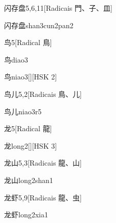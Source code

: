 \begin{entry}{闪存盘}{5,6,11}[Radicais ⾨、⼦、⽫]
  \begin{phonetics}{闪存盘}{shan3cun2pan2}
  \end{phonetics}
\end{entry}

\begin{entry}{鸟}{5}[Radical ⿃]
  \begin{phonetics}{鸟}{diao3}
  \end{phonetics}
  \begin{phonetics}{鸟}{niao3}[][HSK 2]
  \end{phonetics}
\end{entry}

\begin{entry}{鸟儿}{5,2}[Radicais ⿃、⼉]
  \begin{phonetics}{鸟儿}{niao3r5}
  \end{phonetics}
\end{entry}

\begin{entry}{龙}{5}[Radical ⿓]
  \begin{phonetics}{龙}{long2}[][HSK 3]
  \end{phonetics}
\end{entry}

\begin{entry}{龙山}{5,3}[Radicais ⿓、⼭]
  \begin{phonetics}{龙山}{long2shan1}
  \end{phonetics}
\end{entry}

\begin{entry}{龙虾}{5,9}[Radicais ⿓、⾍]
  \begin{phonetics}{龙虾}{long2xia1}
  \end{phonetics}
\end{entry}


